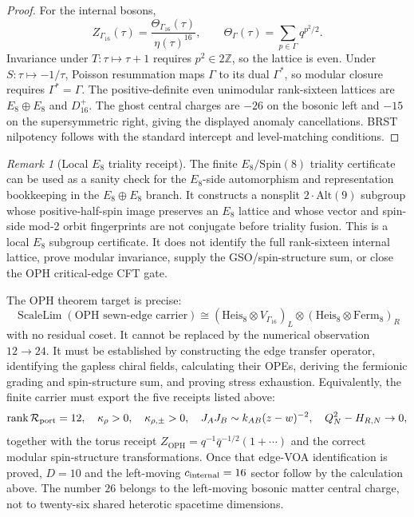 \documentclass[11pt]{article}
\theoremstyle{remark}
\newtheorem{remark}[theorem]{Remark}
\theoremstyle{plain}
\newcommand{\OPH}{\mathrm{OPH}}
\newcommand{\Z}{\mathbb Z}
\newcommand{\calR}{\mathcal R}
\begin{document}
\begin{proof}
For the internal bosons,
\[
Z_{\Gamma_{16}}(\tau)=\frac{\Theta_{\Gamma_{16}}(\tau)}{\eta(\tau)^{16}},
\qquad
\Theta_\Gamma(\tau)=\sum_{p\in\Gamma}q^{p^2/2}.
\]
Invariance under \(T:\tau\mapsto\tau+1\) requires \(p^2\in2\Z\), so the lattice is even. Under
\(S:\tau\mapsto-1/\tau\), Poisson resummation maps \(\Gamma\) to its dual \(\Gamma^\ast\), so
modular closure requires \(\Gamma^\ast=\Gamma\). The positive-definite even unimodular
rank-sixteen lattices are \(E_8\oplus E_8\) and \(D_{16}^+\). The ghost central charges are
\(-26\) on the bosonic left and \(-15\) on the supersymmetric right, giving the displayed anomaly
cancellations. BRST nilpotency follows with the standard intercept and level-matching conditions.
\end{proof}

\begin{remark}[Local \(E_8\) triality receipt]
The finite \(E_8/\mathrm{Spin}(8)\) triality certificate can be used as a sanity check for the
\(E_8\)-side automorphism and representation bookkeeping in the \(E_8\oplus E_8\) branch. It
constructs a nonsplit \(2\!\cdot\!\mathrm{Alt}(9)\) subgroup whose positive-half-spin image preserves
an \(E_8\) lattice and whose vector and spin-side mod-2 orbit fingerprints are not conjugate before
triality fusion. This is a local \(E_8\) subgroup certificate. It does not identify the full
rank-sixteen internal lattice, prove modular invariance, supply the GSO/spin-structure sum, or close
the OPH critical-edge CFT gate.
\end{remark}

The OPH theorem target is precise:
\[
\boxed{
\operatorname{ScaleLim}(\text{OPH sewn-edge carrier})
\cong
\left(\mathrm{Heis}_8\otimes V_{\Gamma_{16}}\right)_L
\otimes
\left(\mathrm{Heis}_8\otimes \mathrm{Ferm}_8\right)_R
}
\]
with no residual coset. It cannot be replaced by the numerical observation \(12\to24\). It must be
established by constructing the edge transfer operator, identifying the gapless chiral fields,
calculating their OPEs, deriving the fermionic grading and spin-structure sum, and proving stress
exhaustion. Equivalently, the finite carrier must export the five receipts listed above:
\[
\operatorname{rank}\calR_{\rm port}=12,\quad
\kappa_\rho>0,\quad
\kappa_{\rho,\pm}>0,\quad
J_AJ_B\sim k_{AB}(z-w)^{-2},\quad
Q_N^2-H_{R,N}\to0,
\]
together with the torus receipt \(Z_{\OPH}=q^{-1}\bar q^{-1/2}(1+\cdots)\) and the correct modular
spin-structure transformations. Once that edge-VOA identification is proved, \(D=10\) and the
left-moving \(c_{\rm internal}=16\) sector follow by the calculation above. The number \(26\)
belongs to the left-moving bosonic matter central charge, not to twenty-six shared heterotic
spacetime dimensions.
\end{document}
